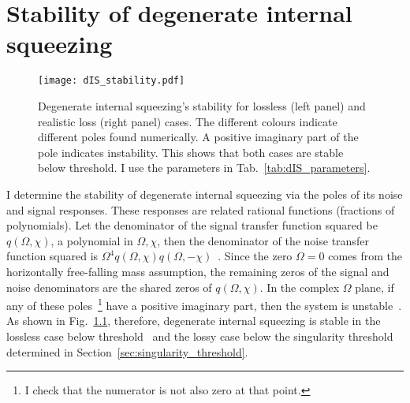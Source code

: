 
\chapter{Stability of degenerate internal squeezing}
\label{app:dIS_stability}

\begin{figure}[ht]
    \centering
    \texttt{[image: dIS\_stability.pdf]}
    \caption{ Degenerate internal squeezing's stability for lossless (left panel) and realistic loss (right panel) cases. The different colours indicate different poles found numerically.
    A positive imaginary part of the pole indicates instability.
    This shows that both cases are stable below threshold. I use the parameters in Tab.~\ref{tab:dIS_parameters}.}
    \label{fig:dIS_stability}
\end{figure}

I determine the stability of degenerate internal squeezing via the poles of its noise and signal responses. These responses are related rational functions (fractions of polynomials). Let the denominator of the signal transfer function squared be $q(\Omega,\chi)$, a polynomial in $\Omega,\chi$, then the denominator of the noise transfer function squared is $\Omega^4 q(\Omega,\chi) q(\Omega,-\chi)$~\cite{korobkoQuantumExpanderGravitationalwave2019}. Since the zero $\Omega=0$ comes from the horizontally free-falling mass assumption, the remaining zeros of the signal and noise denominators are the shared zeros of $q(\Omega,\chi)$. In the complex $\Omega$ plane, if any of these poles~\footnote{I check that the numerator is not also zero at that point.} have a positive imaginary part, then the system is unstable~\cite{}. %
As shown in Fig.~\ref{fig:dIS_stability}, therefore, degenerate internal squeezing is stable in the lossless case below threshold~\cite{} and the lossy case below the singularity threshold determined in Section~\ref{sec:singularity_threshold}.



